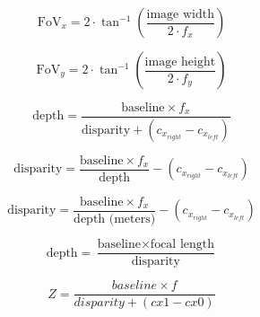 \documentclass{article}
\begin{document}
\[
\text{FoV}_x = 2 \cdot \tan^{-1}\left(\frac{\text{image width}}{2 \cdot f_x}\right)
\]
\pagebreak

\[
\text{FoV}_y = 2 \cdot \tan^{-1}\left(\frac{\text{image height}}{2 \cdot f_y}\right)
\]
\pagebreak

\[
    \text{depth} = \frac{\text{baseline} \times f_x}{\text{disparity} + (c_{x_{right}} - c_{x_{left}})}
\]
\pagebreak

\[
    \text{disparity} = \frac{\text{baseline} \times f_x}{\text{depth}} - (c_{x_{right}} - c_{x_{left}})
\]
\pagebreak

\[
    \text{disparity} = \frac{\text{baseline} \times f_x}{\text{depth (meters)}} - (c_{x_{right}} - c_{x_{left}})
\]
\pagebreak

\[ \text{depth} = \frac{\text{baseline} \times \text{focal length}}{\text{disparity}} \]
\pagebreak

\[ Z = \frac{baseline \times f}{disparity + (cx1 - cx0)} \]
\pagebreak
\end{document}
